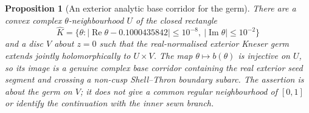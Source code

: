\documentclass[11pt]{amsart}
\newtheorem{proposition}[theorem]{Proposition}
\theoremstyle{definition}
\begin{document}
\begin{proposition}[An exterior analytic base corridor for the germ]
\label{prop:exterior-analytic-germ-corridor}
There are a convex complex $\theta$-neighbourhood $U$ of the closed
rectangle
\[
 \widehat K=\{\theta:|\operatorname{Re}\theta-0.1000435842|
       \le10^{-8},\ |\operatorname{Im}\theta|\le10^{-2}\}
\]
and a disc $V$ about $z=0$ such that the real-normalised exterior Kneser germ
extends jointly holomorphically to $U\times V$.  The map
$\theta\mapsto b(\theta)$ is injective on $U$, so its image is a
genuine complex base corridor containing the real exterior seed
segment and crossing a non-cusp Shell--Thron boundary subarc.
The assertion is about the germ on $V$; it does not give a common
regular neighbourhood of $[0,1]$ or identify the continuation with
the inner sewn branch.
\end{proposition}
\end{document}
